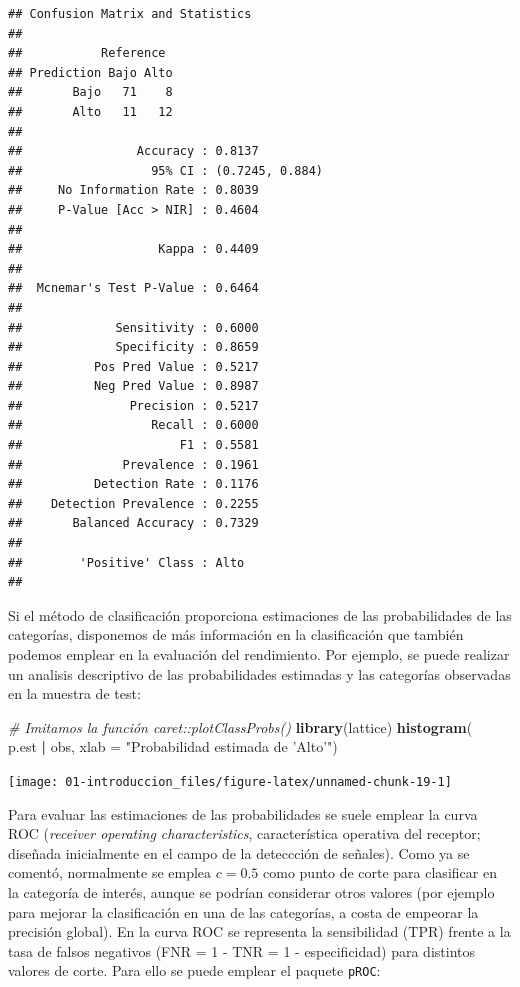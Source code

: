 \documentclass[]{book}
\newenvironment{Shaded}{\begin{snugshade}}{\end{snugshade}}
\newcommand{\KeywordTok}[1]{\textcolor[rgb]{0.13,0.29,0.53}{\textbf{#1}}}
\newcommand{\DataTypeTok}[1]{\textcolor[rgb]{0.13,0.29,0.53}{#1}}
\newcommand{\StringTok}[1]{\textcolor[rgb]{0.31,0.60,0.02}{#1}}
\newcommand{\CommentTok}[1]{\textcolor[rgb]{0.56,0.35,0.01}{\textit{#1}}}
\newcommand{\OperatorTok}[1]{\textcolor[rgb]{0.81,0.36,0.00}{\textbf{#1}}}
\newcommand{\NormalTok}[1]{#1}
\theoremstyle{break}
\theoremstyle{definition}
\theoremstyle{definition}
\theoremstyle{definition}
\theoremstyle{remark}
\begin{document}
\begin{verbatim}
## Confusion Matrix and Statistics
## 
##           Reference
## Prediction Bajo Alto
##       Bajo   71    8
##       Alto   11   12
##                                          
##                Accuracy : 0.8137         
##                  95% CI : (0.7245, 0.884)
##     No Information Rate : 0.8039         
##     P-Value [Acc > NIR] : 0.4604         
##                                          
##                   Kappa : 0.4409         
##                                          
##  Mcnemar's Test P-Value : 0.6464         
##                                          
##             Sensitivity : 0.6000         
##             Specificity : 0.8659         
##          Pos Pred Value : 0.5217         
##          Neg Pred Value : 0.8987         
##               Precision : 0.5217         
##                  Recall : 0.6000         
##                      F1 : 0.5581         
##              Prevalence : 0.1961         
##          Detection Rate : 0.1176         
##    Detection Prevalence : 0.2255         
##       Balanced Accuracy : 0.7329         
##                                          
##        'Positive' Class : Alto           
## 
\end{verbatim}

Si el método de clasificación proporciona estimaciones de las
probabilidades de las categorías, disponemos de más información en la
clasificación que también podemos emplear en la evaluación del
rendimiento. Por ejemplo, se puede realizar un analisis descriptivo de
las probabilidades estimadas y las categorías observadas en la muestra
de test:

\begin{Shaded}
\begin{Highlighting}[]
\CommentTok{# Imitamos la función caret::plotClassProbs()}
\KeywordTok{library}\NormalTok{(lattice) }
\KeywordTok{histogram}\NormalTok{(}\OperatorTok{~}\StringTok{ }\NormalTok{p.est }\OperatorTok{|}\StringTok{ }\NormalTok{obs, }\DataTypeTok{xlab =} \StringTok{"Probabilidad estimada de 'Alto'"}\NormalTok{)}
\end{Highlighting}
\end{Shaded}

\begin{center}\texttt{[image: 01-introduccion\_files/figure-latex/unnamed-chunk-19-1]} \end{center}

Para evaluar las estimaciones de las probabilidades se suele emplear la
curva ROC (\emph{receiver operating characteristics}, característica
operativa del receptor; diseñada inicialmente en el campo de la
deteccción de señales). Como ya se comentó, normalmente se emplea
\(c = 0.5\) como punto de corte para clasificar en la categoría de
interés, aunque se podrían considerar otros valores (por ejemplo para
mejorar la clasificación en una de las categorías, a costa de empeorar
la precisión global). En la curva ROC se representa la sensibilidad
(TPR) frente a la tasa de falsos negativos (FNR = 1 - TNR = 1 -
especificidad) para distintos valores de corte. Para ello se puede
emplear el paquete \texttt{pROC}:
\end{document}
